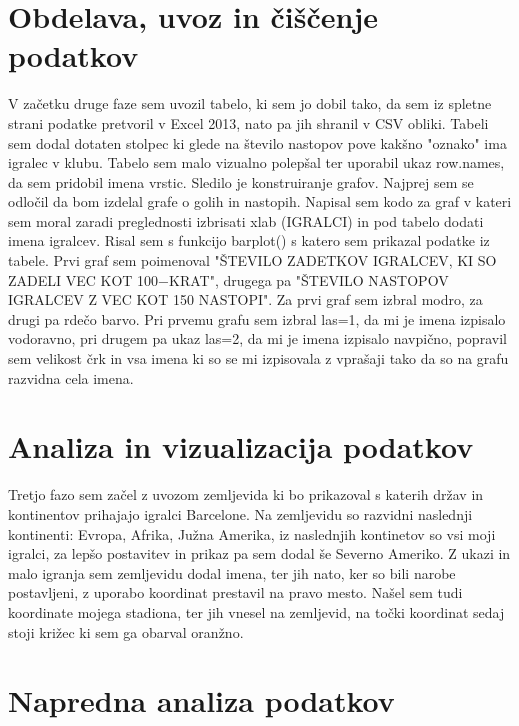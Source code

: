 \documentclass[11pt,a4paper]{article}
\begin{document}
\section{Obdelava, uvoz in čiščenje podatkov}
V začetku druge faze sem uvozil tabelo, ki sem jo dobil tako, da sem iz spletne strani podatke pretvoril v Excel 2013, nato pa jih shranil v CSV obliki. Tabeli sem dodal dotaten stolpec ki glede na število nastopov pove kakšno "oznako" ima igralec v klubu. Tabelo sem malo vizualno polepšal ter uporabil ukaz row.names, da sem pridobil imena vrstic. 
Sledilo je konstruiranje grafov. Najprej sem se odločil da bom izdelal grafe o golih in nastopih. Napisal sem kodo za graf v kateri sem moral zaradi preglednosti izbrisati xlab (IGRALCI) in pod tabelo dodati imena igralcev. Risal sem s funkcijo barplot() s katero sem prikazal podatke iz tabele. Prvi graf sem poimenoval "ŠTEVILO ZADETKOV IGRALCEV, KI SO ZADELI VEC KOT 100−KRAT", drugega pa "ŠTEVILO NASTOPOV IGRALCEV Z VEC KOT 150 NASTOPI". Za prvi graf sem izbral modro, za drugi pa rdečo barvo. Pri prvemu grafu sem izbral las=1, da mi je imena izpisalo vodoravno, pri drugem pa ukaz las=2, da mi je imena izpisalo navpično, popravil sem velikost črk in vsa imena ki so se mi izpisovala z vprašaji tako da so na grafu razvidna cela imena.


\section{Analiza in vizualizacija podatkov}
Tretjo fazo sem začel z uvozom zemljevida ki bo prikazoval s katerih držav in kontinentov prihajajo igralci Barcelone. Na zemljevidu so razvidni naslednji kontinenti: Evropa, Afrika, Južna Amerika, iz naslednjih kontinetov so vsi moji igralci, za lepšo postavitev in prikaz pa sem dodal še Severno Ameriko. Z ukazi in malo igranja sem zemljevidu dodal imena, ter jih nato, ker so bili narobe postavljeni, z uporabo koordinat prestavil na pravo mesto. Našel sem tudi koordinate mojega stadiona, ter jih vnesel na zemljevid, na točki koordinat sedaj stoji križec ki sem ga obarval oranžno.


\section{Napredna analiza podatkov}
\end{document}
